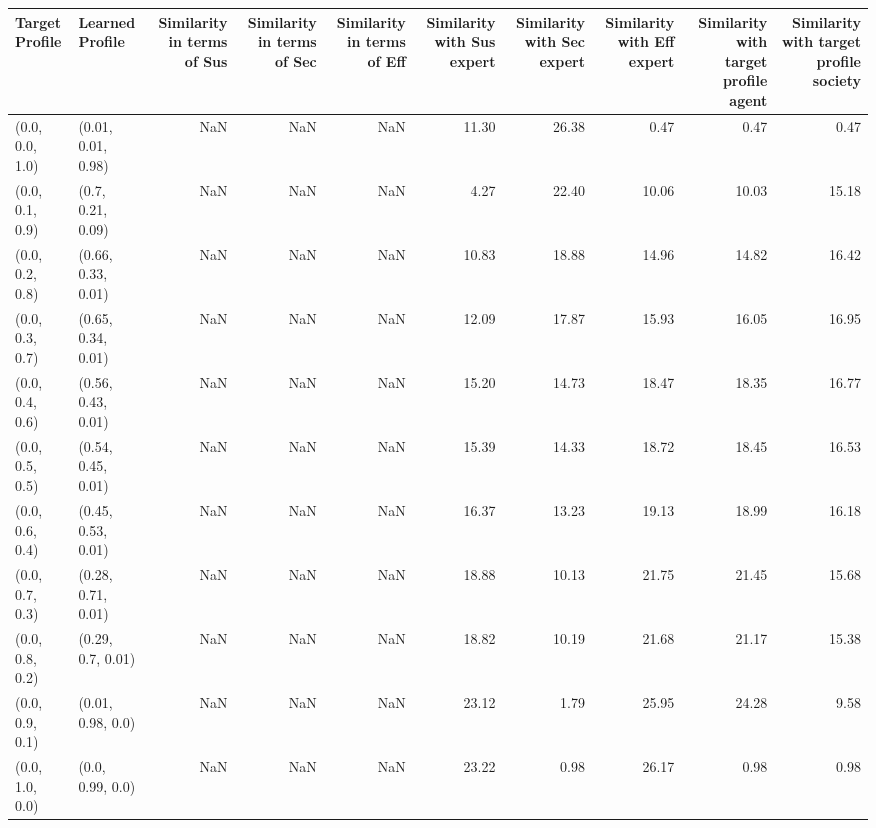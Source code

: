 \begin{tabular}{llrrrrrrrr}
\toprule
Target Profile & Learned Profile & Similarity in terms of Sus & Similarity in terms of Sec & Similarity in terms of Eff & Similarity with Sus expert & Similarity with Sec expert & Similarity with Eff expert & Similarity with target profile agent & Similarity with target profile society \\
\midrule
(0.0, 0.0, 1.0) & (0.01, 0.01, 0.98) & NaN & NaN & NaN & 11.30 & 26.38 & 0.47 & 0.47 & 0.47 \\
(0.0, 0.1, 0.9) & (0.7, 0.21, 0.09) & NaN & NaN & NaN & 4.27 & 22.40 & 10.06 & 10.03 & 15.18 \\
(0.0, 0.2, 0.8) & (0.66, 0.33, 0.01) & NaN & NaN & NaN & 10.83 & 18.88 & 14.96 & 14.82 & 16.42 \\
(0.0, 0.3, 0.7) & (0.65, 0.34, 0.01) & NaN & NaN & NaN & 12.09 & 17.87 & 15.93 & 16.05 & 16.95 \\
(0.0, 0.4, 0.6) & (0.56, 0.43, 0.01) & NaN & NaN & NaN & 15.20 & 14.73 & 18.47 & 18.35 & 16.77 \\
(0.0, 0.5, 0.5) & (0.54, 0.45, 0.01) & NaN & NaN & NaN & 15.39 & 14.33 & 18.72 & 18.45 & 16.53 \\
(0.0, 0.6, 0.4) & (0.45, 0.53, 0.01) & NaN & NaN & NaN & 16.37 & 13.23 & 19.13 & 18.99 & 16.18 \\
(0.0, 0.7, 0.3) & (0.28, 0.71, 0.01) & NaN & NaN & NaN & 18.88 & 10.13 & 21.75 & 21.45 & 15.68 \\
(0.0, 0.8, 0.2) & (0.29, 0.7, 0.01) & NaN & NaN & NaN & 18.82 & 10.19 & 21.68 & 21.17 & 15.38 \\
(0.0, 0.9, 0.1) & (0.01, 0.98, 0.0) & NaN & NaN & NaN & 23.12 & 1.79 & 25.95 & 24.28 & 9.58 \\
(0.0, 1.0, 0.0) & (0.0, 0.99, 0.0) & NaN & NaN & NaN & 23.22 & 0.98 & 26.17 & 0.98 & 0.98 \\
\bottomrule
\end{tabular}
